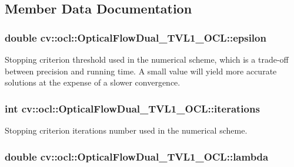 \subsection{Member Data Documentation}
\hypertarget{classcv_1_1ocl_1_1OpticalFlowDual__TVL1__OCL_a25d548ffab3400cd66465f7115424d07}{
\subsubsection[{epsilon}]{\setlength{\rightskip}{0pt plus 5cm}double cv\-::ocl\-::\-Optical\-Flow\-Dual\-\_\-\-T\-V\-L1\-\_\-\-O\-C\-L\-::epsilon}}\label{classcv_1_1ocl_1_1OpticalFlowDual__TVL1__OCL_a25d548ffab3400cd66465f7115424d07}
Stopping criterion threshold used in the numerical scheme, which is a trade-\/off between precision and running time. A small value will yield more accurate solutions at the expense of a slower convergence. \hypertarget{classcv_1_1ocl_1_1OpticalFlowDual__TVL1__OCL_aa9c6277f247c1f99d8fe618fdd8a0dc0}{
\subsubsection[{iterations}]{\setlength{\rightskip}{0pt plus 5cm}int cv\-::ocl\-::\-Optical\-Flow\-Dual\-\_\-\-T\-V\-L1\-\_\-\-O\-C\-L\-::iterations}}\label{classcv_1_1ocl_1_1OpticalFlowDual__TVL1__OCL_aa9c6277f247c1f99d8fe618fdd8a0dc0}
Stopping criterion iterations number used in the numerical scheme. \hypertarget{classcv_1_1ocl_1_1OpticalFlowDual__TVL1__OCL_a66ef203c4490e2ade00b3998cb4d4f41}{
\subsubsection[{lambda}]{\setlength{\rightskip}{0pt plus 5cm}double cv\-::ocl\-::\-Optical\-Flow\-Dual\-\_\-\-T\-V\-L1\-\_\-\-O\-C\-L\-::lambda}}\label{classcv_1_1ocl_1_1OpticalFlowDual__TVL1__OCL_a66ef203c4490e2ade00b3998cb4d4f41}
